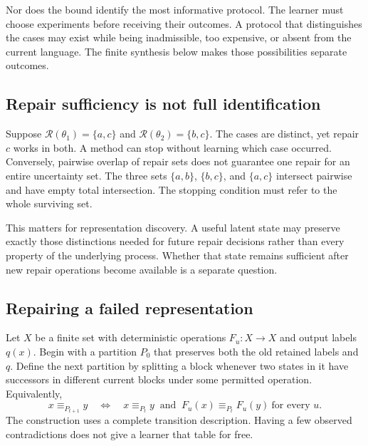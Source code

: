 Nor does the bound identify the most informative protocol. The learner must choose experiments before receiving their outcomes. A protocol that distinguishes the cases may exist while being inadmissible, too expensive, or absent from the current language. The finite synthesis below makes those possibilities separate outcomes.

\subsection{Repair sufficiency is not full identification}
Suppose $\mathcal R(\theta_1)=\{a,c\}$ and $\mathcal R(\theta_2)=\{b,c\}$. The cases are distinct, yet repair $c$ works in both. A method can stop without learning which case occurred. Conversely, pairwise overlap of repair sets does not guarantee one repair for an entire uncertainty set. The three sets $\{a,b\}$, $\{b,c\}$, and $\{a,c\}$ intersect pairwise and have empty total intersection. The stopping condition must refer to the whole surviving set.

This matters for representation discovery. A useful latent state may preserve exactly those distinctions needed for future repair decisions rather than every property of the underlying process. Whether that state remains sufficient after new repair operations become available is a separate question.

\subsection{Repairing a failed representation}
Let $X$ be a finite set with deterministic operations $F_u:X\to X$ and output labels $q(x)$. Begin with a partition $P_0$ that preserves both the old retained labels and $q$. Define the next partition by splitting a block whenever two states in it have successors in different current blocks under some permitted operation. Equivalently,
\[
x\equiv_{P_{t+1}}y
\quad\Longleftrightarrow\quad
x\equiv_{P_t}y\ \text{ and }\
F_u(x)\equiv_{P_t}F_u(y)\ \text{for every }u.
\]
The construction uses a complete transition description. Having a few observed contradictions does not give a learner that table for free.

